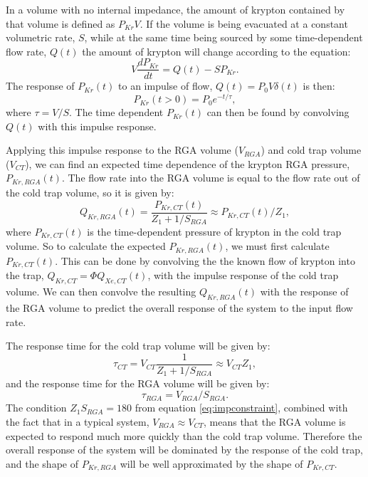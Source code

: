 \documentclass[12pt]{article}
\begin{document}
In a volume with no internal impedance, the amount of krypton contained by that volume is defined as $P_{Kr}V$. If the volume is being evacuated at a constant volumetric rate, $S$, while at the same time being sourced by some time-dependent flow rate, $Q(t)$ the amount of krypton will change according to the equation:
\begin{equation}
V\frac{dP_{Kr}}{dt}=Q(t)-SP_{Kr}.
\end{equation}
The response of $P_{Kr}(t)$ to an impulse of flow, $Q(t)=P_0V\delta(t)$ is then:
\begin{equation}
P_{Kr}(t>0)=P_0e^{-t/\tau},
\end{equation}
where $\tau = V/S$. The time dependent $P_{Kr}(t)$ can then be found by convolving $Q(t)$ with this impulse response.

Applying this impulse response to the RGA volume ($V_{RGA}$) and cold trap volume ($V_{CT}$), we can find an expected time dependence of the krypton RGA pressure, $P_{Kr,RGA}(t)$. The flow rate into the RGA volume is equal to the flow rate out of the cold trap volume, so it is given by:
\begin{equation}
Q_{Kr,RGA}(t)=\frac{P_{Kr,CT}(t)}{Z_1+1/S_{RGA}}\approx P_{Kr,CT}(t)/Z_1,
\end{equation}
where $P_{Kr,CT}(t)$ is the time-dependent pressure of krypton in the cold trap volume. So to calculate the expected $P_{Kr,RGA}(t)$, we must first calculate $P_{Kr,CT}(t)$. This can be done by convolving the the known flow of krypton into the trap, $Q_{Kr,CT}=\Phi Q_{Xe,CT}(t)$, with the impulse response of the cold trap volume. We can then convolve the resulting $Q_{Kr,RGA}(t)$ with the response of the RGA volume to predict the overall response of the system to the input flow rate. 

The response time for the cold trap volume will be given by:
\begin{equation}
\tau_{CT}=V_{CT}\frac{1}{Z_1+1/S_{RGA}} \approx V_{CT}Z_1,
\label{eq:CTtime}
\end{equation}
and the response time for the RGA volume will be given by:
\begin{equation}
\tau_{RGA}=V_{RGA}/S_{RGA}.
\end{equation}
The condition $Z_1S_{RGA}=180$ from equation \ref{eq:impconstraint}, combined with the fact that in a typical system, $V_{RGA}\approx V_{CT}$, means that the RGA volume is expected to respond much more quickly than the cold trap volume. Therefore the overall response of the system will be dominated by the response of the cold trap, and the shape of $P_{Kr,RGA}$ will be well approximated by the shape of $P_{Kr,CT}$.
\end{document}
